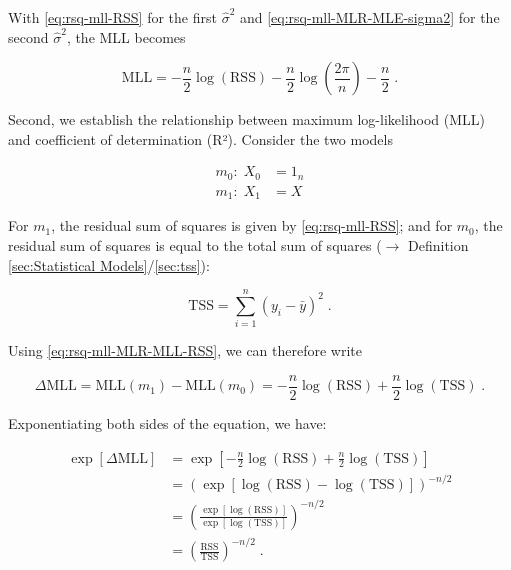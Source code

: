 \documentclass[a4paper,12pt,twoside]{book}
\begin{document}
With \eqref{eq:rsq-mll-RSS} for the first $\hat{\sigma}^2$ and \eqref{eq:rsq-mll-MLR-MLE-sigma2} for the second $\hat{\sigma}^2$, the MLL becomes

\begin{equation} \label{eq:rsq-mll-MLR-MLL-RSS}
\mathrm{MLL} = - \frac{n}{2} \log(\mathrm{RSS}) - \frac{n}{2} \log \left( \frac{2\pi}{n} \right) - \frac{n}{2} \; .
\end{equation}

Second, we establish the relationship between maximum log-likelihood (MLL) and coefficient of determination (R²). Consider the two models

\begin{equation} \label{eq:rsq-mll-m0-m1}
\begin{split}
m_0: \; X_0 &= 1_n \\
m_1: \; X_1 &= X
\end{split}
\end{equation}

For $m_1$, the residual sum of squares is given by \eqref{eq:rsq-mll-RSS}; and for $m_0$, the residual sum of squares is equal to the total sum of squares ($\rightarrow$ Definition \ref{sec:Statistical Models}/\ref{sec:tss}):

\begin{equation} \label{eq:rsq-mll-TSS}
\mathrm{TSS} = \sum_{i=1}^n (y_i - \bar{y})^2 \; .
\end{equation}

Using \eqref{eq:rsq-mll-MLR-MLL-RSS}, we can therefore write

\begin{equation} \label{eq:rsq-mll-MLR-DMLL}
\Delta\mathrm{MLL} = \mathrm{MLL}(m_1) - \mathrm{MLL}(m_0) = - \frac{n}{2} \log(\mathrm{RSS}) + \frac{n}{2} \log(\mathrm{TSS}) \; .
\end{equation}

Exponentiating both sides of the equation, we have:

\begin{equation} \label{eq:rsq-mll-MLR-DMLL-RTSS}
\begin{split}
\exp[\Delta\mathrm{MLL}] &= \exp\left[ - \frac{n}{2} \log(\mathrm{RSS}) + \frac{n}{2} \log(\mathrm{TSS}) \right] \\
&= \left( \exp\left[ \log(\mathrm{RSS}) - \log(\mathrm{TSS}) \right] \right)^{-n/2} \\
&= \left( \frac{\exp[\log(\mathrm{RSS})]}{\exp[\log(\mathrm{TSS})]} \right)^{-n/2} \\
&= \left( \frac{\mathrm{RSS}}{\mathrm{TSS}} \right)^{-n/2} \; .
\end{split}
\end{equation}
\end{document}
